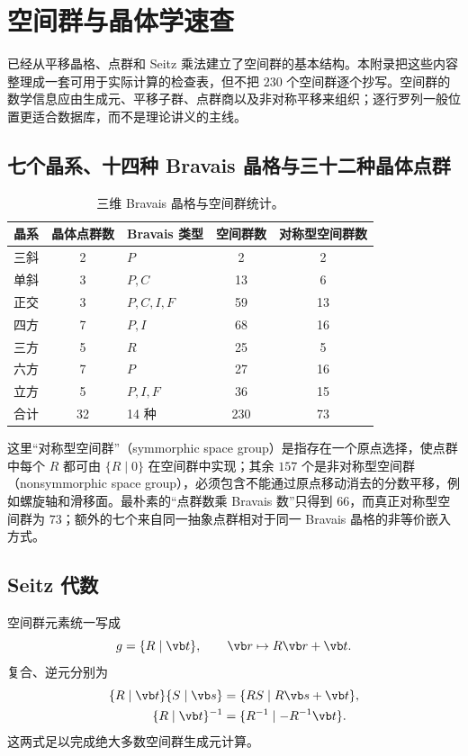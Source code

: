 \chapter{空间群与晶体学速查}
\label{app:space-group-reference}

已经从平移晶格、点群和 Seitz 乘法建立了空间群的基本结构。本附录把这些内容整理成一套可用于实际计算的检查表，但不把 $230$ 个空间群逐个抄写。空间群的数学信息应由生成元、平移子群、点群商以及非对称平移来组织；逐行罗列一般位置更适合数据库，而不是理论讲义的主线。

\section{七个晶系、十四种 Bravais 晶格与三十二种晶体点群}

\begin{table}[htbp]
\centering
\caption{三维 Bravais 晶格与空间群统计。}
\label{tab:bravais-space-counts}
\begin{tabular}{cclcc}
\toprule
晶系 & 晶体点群数 & Bravais 类型 & 空间群数 & 对称型空间群数\\
\midrule
三斜 &2& $P$ &2&2\\
单斜 &3& $P,C$ &13&6\\
正交 &3& $P,C,I,F$ &59&13\\
四方 &7& $P,I$ &68&16\\
三方 &5& $R$ &25&5\\
六方 &7& $P$ &27&16\\
立方 &5& $P,I,F$ &36&15\\
\midrule
合计 &32&14 种 &230&73\\
\bottomrule
\end{tabular}
\end{table}

这里“对称型空间群”（symmorphic space group）是指存在一个原点选择，使点群中每个 $R$ 都可由 $\{R\mid0\}$ 在空间群中实现；其余 $157$ 个是非对称型空间群（nonsymmorphic space group），必须包含不能通过原点移动消去的分数平移，例如螺旋轴和滑移面。最朴素的“点群数乘 Bravais 数”只得到 $66$，而真正对称型空间群为 $73$；额外的七个来自同一抽象点群相对于同一 Bravais 晶格的非等价嵌入方式。

\section{Seitz 代数}

空间群元素统一写成
\[
g=\{R\mid\vb t\},
\qquad
\vb r\mapsto R\vb r+\vb t.
\]
复合、逆元分别为
\begin{align}
\{R\mid\vb t\}\{S\mid\vb s\}
&=\{RS\mid R\vb s+\vb t\},\label{eq:seitz-product-app}\\
\{R\mid\vb t\}^{-1}
&=\{R^{-1}\mid-R^{-1}\vb t\}.
\label{eq:seitz-inverse-app}
\end{align}
这两式足以完成绝大多数空间群生成元计算。

